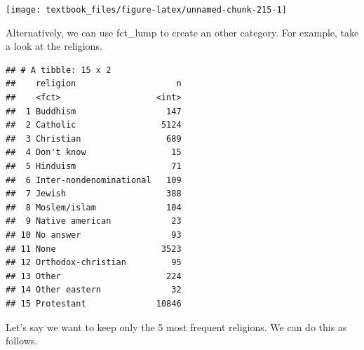\documentclass[]{tufte-book}
\newenvironment{Shaded}{}{}
\newcommand{\DataTypeTok}[1]{\textcolor[rgb]{0.56,0.13,0.00}{#1}}
\newcommand{\DecValTok}[1]{\textcolor[rgb]{0.25,0.63,0.44}{#1}}
\newcommand{\KeywordTok}[1]{\textcolor[rgb]{0.00,0.44,0.13}{\textbf{#1}}}
\newcommand{\NormalTok}[1]{#1}
\newcommand{\OperatorTok}[1]{\textcolor[rgb]{0.40,0.40,0.40}{#1}}
\newcommand{\StringTok}[1]{\textcolor[rgb]{0.25,0.44,0.63}{#1}}
\begin{document}
\begin{Shaded}
\end{Shaded}

\texttt{[image: textbook\_files/figure-latex/unnamed-chunk-215-1]}

Alternatively, we can use fct\_lump to create an other category. For example, take a look at the religions.

\begin{Shaded}
\end{Shaded}

\begin{verbatim}
## # A tibble: 15 x 2
##    religion                    n
##    <fct>                   <int>
##  1 Buddhism                  147
##  2 Catholic                 5124
##  3 Christian                 689
##  4 Don't know                 15
##  5 Hinduism                   71
##  6 Inter-nondenominational   109
##  7 Jewish                    388
##  8 Moslem/islam              104
##  9 Native american            23
## 10 No answer                  93
## 11 None                     3523
## 12 Orthodox-christian         95
## 13 Other                     224
## 14 Other eastern              32
## 15 Protestant              10846
\end{verbatim}

Let's say we want to keep only the 5 most frequent religions. We can do this as follows.

\begin{Shaded}
\end{Shaded}
\end{document}
